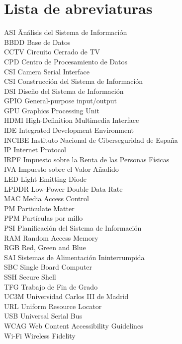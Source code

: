 \newpage %
\thispagestyle{empty}
\mbox{}

\chapter*{Lista de abreviaturas}
\begin{tabbing}  %
	ASI \quad\quad\quad\= Análisis del Sistema de Información \\
	BBDD \> Base de Datos \\
	CCTV \> Circuito Cerrado de TV \\
	CPD \>  Centro de Procesamiento de Datos \\
	CSI \> Camera Serial Interface \\
	CSI \> Construcción del Sistema de Información \\
	DSI \> Diseño del Sistema de Información \\
	GPIO \> General-purpose input/output \\
	GPU \> Graphics Processing Unit \\
	HDMI \> High-Definition Multimedia Interface \\
	IDE \> Integrated Development Environment \\
	INCIBE \> Instituto Nacional de Ciberseguridad de España \\
	IP \> Internet Protocol \\
	IRPF \> Impuesto sobre la Renta de las Personas Físicas \\
	IVA \>  Impuesto sobre el Valor Añadido \\
	LED \> Light Emitting Diode \\
	LPDDR \> Low-Power Double Data Rate \\
	MAC \> Media Access Control \\
	PM \> Particulate Matter \\
	PPM \> Partículas por millo \\
	PSI \> Planificación del Sistema de Información \\
	RAM \> Random Access Memory \\
	RGB \> Red, Green and Blue \\
	SAI \> Sistemas de Alimentación Ininterrumpida \\
	SBC \> Single Board Computer \\
	SSH \> Secure Shell \\
	TFG \>  Trabajo de Fin de Grado \\
	UC3M  \>  Universidad Carlos III de Madrid \\
	URL \> Uniform Resource Locator \\
	USB \> Universal Serial Bus \\
	WCAG \> Web Content Accessibility Guidelines \\
	Wi-Fi \> Wireless Fidelity
\end{tabbing}